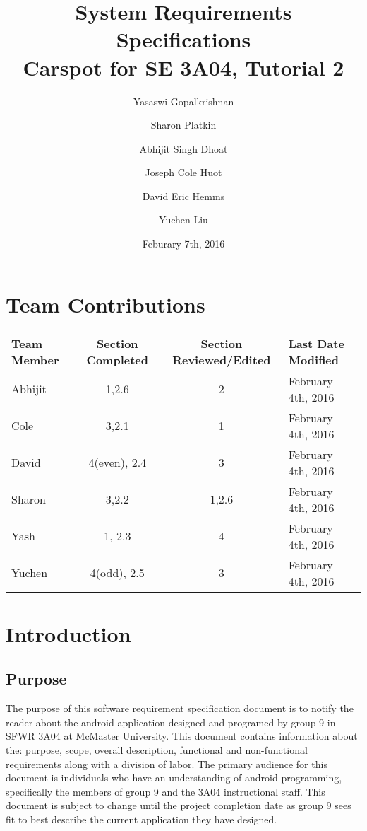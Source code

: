 \documentclass[12pt]{article}
\title{System Requirements Specifications\\
	\large Carspot for SE 3A04, Tutorial 2}
\author{
         Yasaswi Gopalkrishnan\\ \newline
         \and
         Sharon Platkin \\ \newline
         \and 
         Abhijit Singh Dhoat\\ \newline
         \and
         Joseph Cole Huot\\ \newline
         \and
         David Eric Hemms\\ \newline
         \and 
         Yuchen Liu\\ \newline
    }
\date{Feburary 7th, 2016}
\begin{document}
\maketitle
\newpage
\tableofcontents
\listoftables
\newpage

\section{Team Contributions}
\begin{table}[h!]
\caption{Work Division}
\begin{longtable}{ | l | c | c | p{4cm} |}
	\hline
	Team Member & Section Completed & Section Reviewed/Edited & Last Date Modified \\ \hline
	Abhijit & 1,2.6 & 2 & February 4th, 2016\\ \hline
	Cole & 3,2.1 & 1 & February 4th, 2016\\ \hline
	David & 4(even), 2.4 & 3 & February 4th, 2016\\ \hline
	Sharon & 3,2.2 & 1,2.6 & February 4th, 2016\\ \hline
	Yash & 1, 2.3 & 4 & February 4th, 2016\\ \hline
	Yuchen & 4(odd), 2.5 & 3 & February 4th, 2016\\ \hline
\end{longtable}
\end{table}
\newpage

\section{Introduction}
\subsection{Purpose}
The purpose of this software requirement specification document is to notify the reader about the android application designed and programed by group 9 in SFWR 3A04 at McMaster University. This document contains information about the: purpose, scope, overall description, functional and non-functional requirements along with a division of labor. The primary audience for this document is individuals who have an understanding of android programming, specifically the members of group 9 and the 3A04 instructional staff. This document is subject to change until the project completion date as group 9 sees fit to best describe the current application they have designed.
\end{document}
